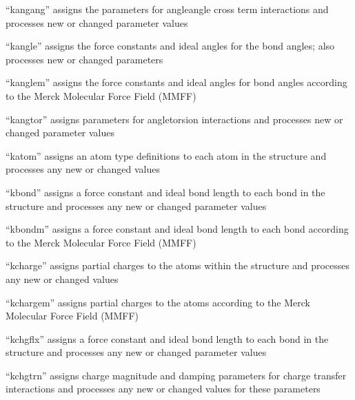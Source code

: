 \documentclass[letterpaper,11pt,english]{sphinxmanual}
\begin{document}

“kangang” assigns the parameters for angle\sphinxhyphen{}angle cross term
interactions and processes new or changed parameter values


“kangle” assigns the force constants and ideal angles for
the bond angles; also processes new or changed parameters


“kanglem” assigns the force constants and ideal angles for
bond angles according to the Merck Molecular Force Field (MMFF)


“kangtor” assigns parameters for angle\sphinxhyphen{}torsion interactions
and processes new or changed parameter values


“katom” assigns an atom type definitions to each atom in
the structure and processes any new or changed values


“kbond” assigns a force constant and ideal bond length
to each bond in the structure and processes any new or
changed parameter values


“kbondm” assigns a force constant and ideal bond length to
each bond according to the Merck Molecular Force Field (MMFF)


“kcharge” assigns partial charges to the atoms within
the structure and processes any new or changed values


“kchargem” assigns partial charges to the atoms according to
the Merck Molecular Force Field (MMFF)


“kchgflx” assigns a force constant and ideal bond length
to each bond in the structure and processes any new or
changed parameter values


“kchgtrn” assigns charge magnitude and damping parameters for
charge transfer interactions and processes any new or changed
values for these parameters
\end{document}
